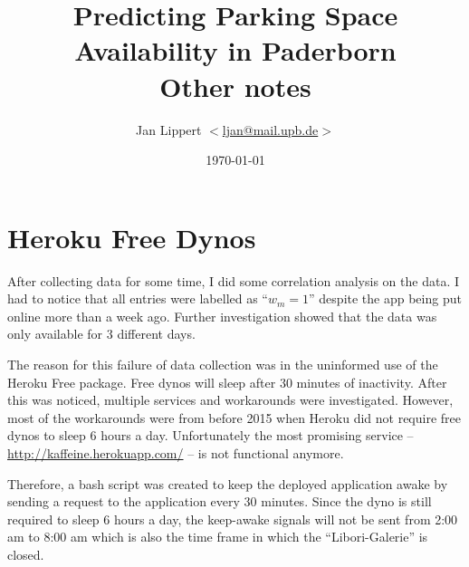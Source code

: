 \documentclass[journal,10pt]{IEEEtran}
\title{Predicting Parking Space Availability in Paderborn\\
Other notes}
\author{Jan Lippert \(<\)\href{mailt:ljan@mail.upb.de}{ljan@mail.upb.de}\(>\)}
\date{\today}
\newcommand{\wom}{w_m}
\begin{document}
\maketitle


\section{Heroku Free Dynos}
After collecting data for some time, I did some correlation analysis on the data. I had to notice that all entries were labelled as ``\(\wom = 1\)'' despite the app being put online more than a week ago. Further investigation showed that the data was only available for 3 different days. 

The reason for this failure of data collection was in the uninformed use of the Heroku Free package. Free dynos will sleep after 30 minutes of inactivity. After this was noticed, multiple services and workarounds were investigated. However, most of the workarounds were from before 2015 when Heroku did not require free dynos to sleep 6 hours a day. Unfortunately the most promising service -- \url{http://kaffeine.herokuapp.com/} -- is not functional anymore.

Therefore, a bash script was created to keep the deployed application awake by sending a request to the application every 30 minutes. Since the dyno is still required to sleep 6 hours a day, the keep-awake signals will not be sent from 2:00 am to 8:00 am which is also the time frame in which the ``Libori-Galerie'' is closed.

  
\end{document}
